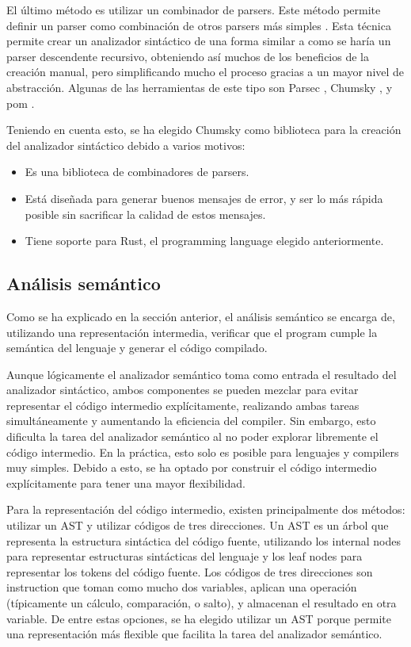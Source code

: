 El último método es utilizar un combinador de \glspl{parser}. Este método
permite definir un \gls{parser} como combinación de otros \glspl{parser} más
simples \parencite{parser-combinators}. Esta técnica permite crear un analizador
sintáctico de una forma similar a como se haría un \gls{parser} descendente
recursivo, obteniendo así muchos de los beneficios de la creación manual, pero
simplificando mucho el proceso gracias a un mayor nivel de abstracción. Algunas
de las herramientas de este tipo son Parsec \parencite{parsec}, Chumsky
\parencite{chumsky}, y pom \parencite{pom}.

Teniendo en cuenta esto, se ha elegido Chumsky como biblioteca para la creación
del analizador sintáctico debido a varios motivos:

\begin{itemize}
    \item Es una biblioteca de combinadores de \glspl{parser}.
    \item Está diseñada para generar buenos mensajes de error, y ser lo más
    rápida posible sin sacrificar la calidad de estos mensajes.
    \item Tiene soporte para Rust, el \gls{programming language} elegido
    anteriormente.
\end{itemize}

\subsection{Análisis semántico}\label{subsec:compiler}

Como se ha explicado en la sección anterior, el análisis semántico se encarga
de, utilizando una representación intermedia, verificar que el \gls{program}
cumple la semántica del lenguaje y generar el código compilado.

Aunque lógicamente el analizador semántico toma como entrada el resultado del
analizador sintáctico, ambos componentes se pueden mezclar para evitar
representar el código intermedio explícitamente, realizando ambas tareas
simultáneamente y aumentando la eficiencia del \gls{compiler}. Sin embargo, esto
dificulta la tarea del analizador semántico al no poder explorar libremente el
código intermedio. En la práctica, esto solo es posible para lenguajes y
\glspl{compiler} muy simples. Debido a esto, se ha optado por construir el
código intermedio explícitamente para tener una mayor flexibilidad.
\parencite{compiler-design}

Para la representación del código intermedio, existen principalmente dos
métodos: utilizar un \gls{AST} y utilizar códigos de tres direcciones. Un
\gls{AST} es un árbol que representa la estructura sintáctica del código fuente,
utilizando los \glspl{internal node} para representar estructuras sintácticas
del lenguaje y los \glspl{leaf node} para representar los \glspl{token} del
código fuente. Los códigos de tres direcciones son \gls{instruction} que toman
como mucho dos variables, aplican una operación (típicamente un cálculo,
comparación, o salto), y almacenan el resultado en otra variable. De entre estas
opciones, se ha elegido utilizar un \gls{AST} porque permite una representación
más flexible que facilita la tarea del analizador semántico.
\parencite{dragon-book}


